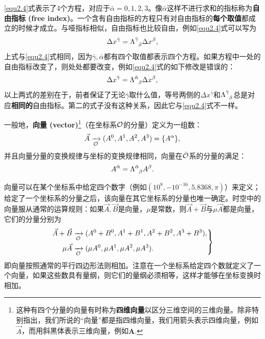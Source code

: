 \eqref{equ2.4}式表示了4个方程，对应于$\bar{\alpha} = 0, 1, 2, 3$。像$\bar{\alpha}$这样不进行求和的指标称为\textbf{自由指标 (free index)}。一个含有自由指标的方程只有对自由指标的\textbf{每个取值}都成立的时候才成立。与哑指标相似，自由指标也比较自由，例如\eqref{equ2.4}式可以写为
\begin{equation*}
    \Delta x^{\bar{\gamma}} = \Lambda\indices{^{\bar{\gamma}}_{\beta}} \Delta x^\beta,
\end{equation*}
上式与\eqref{equ2.4}式相同，因为$\bar{\gamma}, \bar{\alpha}$都有四个取值都表示四个方程。如果方程中一处的自由指标改变了，则处处都要改变，例如\eqref{equ2.4}式的如下修改是错误的：
\begin{equation*}
    \Delta x^{\bar{\gamma}} = \Lambda\indices{^{\bar{\alpha}}_{\beta}} \Delta x^\beta,
\end{equation*}
以上两式的差别在于，前者保证了无论$\bar{\gamma}$取什么值，等号两侧的$\Delta x^{\bar{\gamma}}$和$\Lambda\indices{^{\bar{\gamma}}_\beta}$总是对应\textbf{相同的}自由指标。第二的式子没有这种关系，因此它与\eqref{equ2.4}式不一样。

一般地，\textbf{向量 (vector)}\footnote{这种有四个分量的向量有时称为\textbf{四维向量}以区分三维空间的三维向量。除非特别指出，我们所说的“向量”都是指四维向量，我们用箭头表示四维向量，例如$\vec{A}$，而用斜黑体表示三维向量，例如$\bm{A}$. }（在坐标系$\mathcal{O}$的分量）定义为一组数：
\begin{equation}
    \vec{A} \xrightarrow[\mathcal{O}]{ } (A^0, A^1, A^2, A^3) = \{ A^\alpha \},
\label{equ2.6}
\end{equation}
并且向量分量的变换规律与坐标的变换规律相同，向量在$\bar{\mathcal{O}}$系的分量的满足：
\begin{equation}
    A^{\bar{\alpha}} = \Lambda\indices{^{\bar{\alpha}}_\beta} A^{\beta}.
\label{equ2.7}
\end{equation}

向量可以在某个坐标系中给定四个数字（例如$(10^8, -10^{-16}, 5.8368, \pi)$）来定义；给定了一个坐标系的分量之后，该向量在其它坐标系的分量也唯一确定。时空中的向量服从通常的运算规则：如果$\vec{A}, \vec{B}$是向量，$\mu$是常数，则$\vec{A} + \vec{B}$与$\mu \vec{A}$都是向量，它们的分量分别为
\begin{equation}
\left.
\begin{split}
    \vec{A} + \vec{B} &\xrightarrow[\mathcal{O}]{ } (A^0+B^0, A^1+B^1, A^2+B^2, A^3+B^3), \\
    \mu \vec{A} &\xrightarrow[\mathcal{O}]{ } (\mu A^0, \mu A^1, \mu A^2, \mu A^3).
\end{split}
\right\}
\label{equ2.8}
\end{equation}
即向量按照通常的平行四边形法则相加。注意在一个坐标系给定四个数就定义了一个向量，如果这些数具有量纲，则它们的量纲必须相等，这样才能够在坐标变换时相加。


